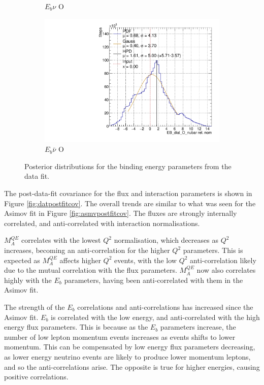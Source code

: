 \begin{figure}
\begin{subfigure}{.48\textwidth}
  \caption{$E_{b}\nu$ O}
\end{subfigure}
\begin{subfigure}{.48\textwidth}
  \centering
  \includegraphics[width=0.73\linewidth]{figs/EB_dial_O_nubarData}
  \caption{$E_{b}\bar{\nu}$ O}
\end{subfigure}
\caption{Posterior distributions for the binding energy parameters from the data fit.}
\label{fig:Ebdatares}
\end{figure}

The post-data-fit covariance for the flux and interaction parameters is shown in Figure \ref{fig:datpostfitcov}. The overall trends are similar to what was seen for the Asimov fit in Figure \ref{fig:asmvpostfitcov}. The fluxes are strongly internally correlated, and anti-correlated with interaction normalisations. 

$M^{QE}_A$ correlates with the lowest $Q^2$ normalisation, which decreases as $Q^2$ increases, becoming an anti-correlation for the higher $Q^2$ parameters. This is expected as $M^{QE}_A$ affects higher $Q^2$ events, with the low $Q^2$ anti-correlation likely due to the mutual correlation with the flux parameters. $M^{QE}_A$ now also correlates highly with the $E_b$ parameters, having been anti-correlated with them in the Asimov fit.

The strength of the $E_b$ correlations and anti-correlations has increased since the Asimov fit. $E_b$ is correlated with the low energy, and anti-correlated with the high energy flux parameters. This is because as the $E_b$ parameters increase, the number of low lepton momentum events increases as events shifts to lower momentum. This can be compensated by low energy flux parameters decreasing, as lower energy neutrino events are likely to produce lower momentum leptons, and so the anti-correlations arise. The opposite is true for higher energies, causing positive correlations.

